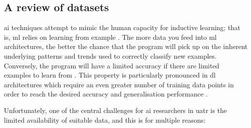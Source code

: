 \subsection{A review of datasets}

\acrshort{ai} techniques attempt to mimic the human capacity for inductive learning; that is, \acrlong{ml} relies on learning from example \cite{russell_inductive_1991}. The more data you feed into \acrshort{ml} architectures, the better the chance that the program will pick up on the inherent underlying patterns and trends used to correctly classify new examples. Conversely, the program will have a limited accuracy if there are limited examples to learn from \cite{neupane_review_2020}. This property is particularly pronounced in \acrlong{dl} architectures which require an even greater number of training data points in order to reach the desired accuracy and generalisation performance \cite{schmitt_there_2023}. 

Unfortunately, one of the central challenges for \acrshort{ai} researchers in \acrshort{uatr} is the limited availability of suitable data, and this is for multiple reasons:

